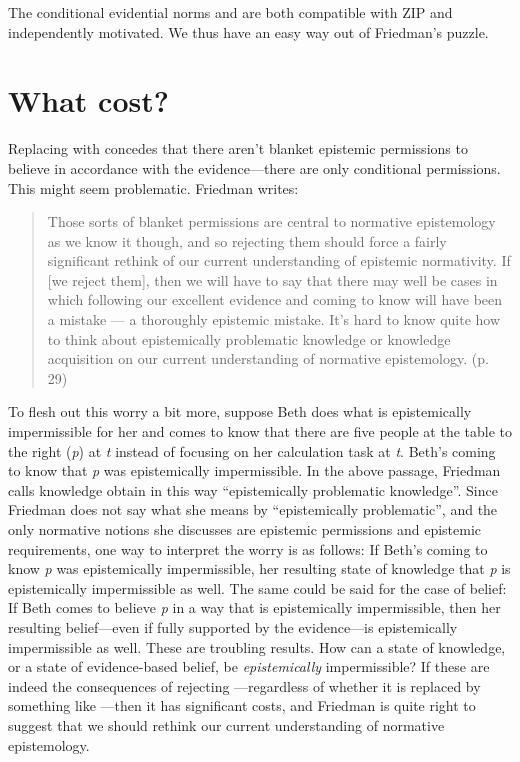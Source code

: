 \documentclass[12pt]{article}
\begin{document}
The conditional evidential norms \eoc{} and \epc{} are both compatible with ZIP and independently motivated. We thus have an easy way out of Friedman's puzzle.

\section{What cost?}\label{sec:cost}

Replacing \ep{} with \epc{} concedes that there aren't blanket epistemic permissions to believe in accordance with the evidence---there are only conditional permissions. This might seem problematic. Friedman writes:

\begin{quote}
    Those sorts of blanket permissions are central to normative epistemology as we know it though, and so rejecting them should force a fairly significant rethink of our current understanding of epistemic normativity. If [we reject them], then we will have to say that there may well be cases in which following our excellent evidence and coming to know will have been a mistake — a thoroughly epistemic mistake. It’s hard to know quite how to think about epistemically problematic knowledge or knowledge acquisition on our current understanding of normative epistemology. (p. 29)
\end{quote}
%
To flesh out this worry a bit more, suppose Beth does what is epistemically impermissible for her and comes to know that there are five people at the table to the right (\textit{p}) at \textit{t} instead of focusing on her calculation task at \textit{t}. Beth's coming to know that \textit{p} was epistemically impermissible. In the above passage, Friedman calls knowledge obtain in this way ``epistemically problematic knowledge''. Since Friedman does not say what she means by ``epistemically problematic'', and the only normative notions she discusses are epistemic permissions and epistemic requirements, one way to interpret the worry is as follows: If Beth's coming to know \textit{p} was epistemically impermissible, her resulting state of knowledge that \textit{p} is epistemically impermissible as well. The same could be said for the case of belief: If Beth comes to believe \textit{p} in a way that is epistemically impermissible, then her resulting belief---even if fully supported by the evidence---is epistemically impermissible as well. These are troubling results. How can a state of knowledge, or a state of evidence-based belief, be \textit{epistemically} impermissible? If these are indeed the consequences of rejecting \ep{}---regardless of whether it is replaced by something like \epc{}---then it has significant costs, and Friedman is quite right to suggest that we should rethink our current understanding of normative epistemology.
\end{document}
